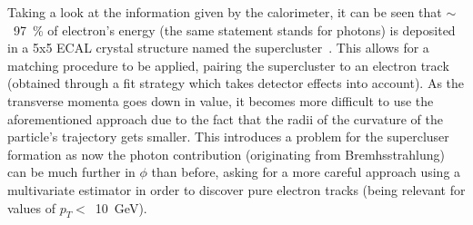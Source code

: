 \hspace{10pt} Taking a look at the information given by the calorimeter, it can be seen that $\sim$~97~\% of electron's energy (the same statement stands for photons) is deposited in a 5x5 ECAL crystal structure named the supercluster~\cite{twiki_ecal_clustering}. This allows for a matching procedure to be applied, pairing the supercluster to an electron track (obtained through a fit strategy which takes detector effects into account). As the transverse momenta goes down in value, it becomes more difficult to use the aforementioned approach due to the fact that the radii of the curvature of the particle's trajectory gets smaller. This introduces a problem for the supercluser formation as now the photon contribution (originating from Bremhsstrahlung) can be much further in $\phi$ than before, asking for a more careful approach using a multivariate estimator in order to discover pure electron tracks (being relevant for values of $p_T<$~10~GeV).

